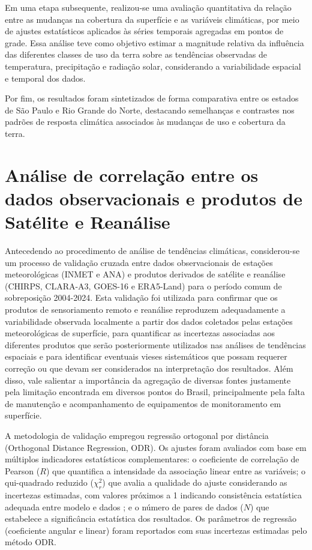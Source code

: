 Em uma etapa subsequente, realizou-se uma avaliação quantitativa da relação entre as mudanças na cobertura da superfície e as variáveis climáticas, por meio de ajustes estatísticos aplicados às séries temporais agregadas em pontos de grade. Essa análise teve como objetivo estimar a magnitude relativa da influência das diferentes classes de uso da terra sobre as tendências observadas de temperatura, precipitação e radiação solar, considerando a variabilidade espacial e temporal dos dados.

Por fim, os resultados foram sintetizados de forma comparativa entre os estados de São Paulo e Rio Grande do Norte, destacando semelhanças e contrastes nos padrões de resposta climática associados às mudanças de uso e cobertura da terra.


\section{Análise de correlação entre os dados observacionais e produtos de Satélite e Reanálise}

Antecedendo ao procedimento de análise de tendências climáticas, considerou-se um processo de validação cruzada entre dados observacionais de estações meteorológicas (INMET e ANA) e produtos derivados de satélite e reanálise (CHIRPS, CLARA-A3, GOES-16 e ERA5-Land) para o período comum de sobreposição 2004-2024. Esta validação foi utilizada para confirmar que os produtos de sensoriamento remoto e reanálise reproduzem adequadamente a variabilidade observada localmente a partir dos dados coletados pelas estações meteorológicas de superfície, para quantificar as incertezas associadas aos diferentes produtos que serão posteriormente utilizados nas análises de tendências espaciais e para identificar eventuais vieses sistemáticos que possam requerer correção ou que devam ser considerados na interpretação dos resultados. Além disso, vale salientar a importância da agregação de diversas fontes justamente pela limitação encontrada em diversos pontos do Brasil, principalmente pela falta de manutenção e acompanhamento de equipamentos de monitoramento em superfície.

A metodologia de validação empregou regressão ortogonal por distância (Orthogonal Distance Regression, ODR). Os ajustes foram avaliados com base em múltiplos indicadores estatísticos complementares: o coeficiente de correlação de Pearson ($R$) que quantifica a intensidade da associação linear entre as variáveis; o qui-quadrado reduzido ($\chi^2_r$) que avalia a qualidade do ajuste considerando as incertezas estimadas, com valores próximos a 1 indicando consistência estatística adequada entre modelo e dados \citep{press2007numerical}; e o número de pares de dados ($N$) que estabelece a significância estatística dos resultados. Os parâmetros de regressão (coeficiente angular e linear) foram reportados com suas incertezas estimadas pelo método ODR.

